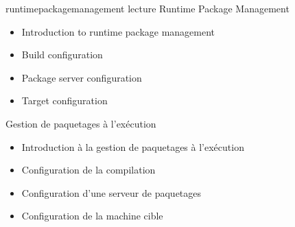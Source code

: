 {runtimepackagemanagement}
{lecture}
{Runtime Package Management}
{
  \begin{itemize}
  \item Introduction to runtime package management
  \item Build configuration
  \item Package server configuration
  \item Target configuration
  \end{itemize}
}
{Gestion de paquetages à l'exécution}
{
  \begin{itemize}
  \item Introduction à la gestion de paquetages à l'exécution
  \item Configuration de la compilation
  \item Configuration d'une serveur de paquetages
  \item Configuration de la machine cible
  \end{itemize}
}

\def \onlineagenda {
  \showagendaday{1}
  \showagendaitem{intro}{lecture}
  \showagendaitem{overview}{lecture}
  \showagendaitem{usingbasics}{lecture}
  \showagendaitem{firstbuild}{lab}
  \showagendaitem{flashingbooting}{lab}
  \showagendaday{2}
  \showagendaitem{usingadvanced}{lecture}
  \showagendaitem{nfsconfiguring}{lab}
  \showagendaitem{writingrecipesbasics}{lecture}
  \showagendaitem{appcompilation}{lab}
  \showagendaitem{writingrecipesadvanced}{lecture}
  \showagendaday{3}
  \showagendaitem{layers}{lecture}
  \showagendaitem{writinglayer}{lab}
  \showagendaitem{extendrecipe}{lab}
  \showagendaitem{writingbsp}{lecture}
  \showagendaitem{kernelchanges}{lab}
  \showagendaitem{distrolayer}{lecture}
  \showagendaday{4}
  \showagendaitem{image}{lecture}
  \showagendaitem{image}{lab}
  \showagendaitem{writingrecipesgoingfurther}{lecture}
  \showagendaitem{licensing}{lecture}
  \showagendaitem{sdk}{lecture}
  \showagendaitem{sdk}{lab}
  \showagendaitem{devtool}{lecture}
  \showagendaitem{devtool}{lab}
  \showagendaitem{automatinglayermanagement}{lecture}
  \showagendaitem{runtimepackagemanagement}{lecture}
  \showagendaitem{qna}{misc}
}

